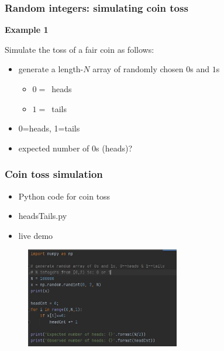 \documentclass[english,14pt]{beamer}
\begin{document}
\begin{frame}[fragile]

\frametitle{Random integers: simulating coin toss}

\textbf{Example 1}\\
\vspace*{5mm}

Simulate the toss of a fair coin as follows:

\begin{itemize}
	\item generate a length-$N$ array of randomly chosen $0$s and $1$s
	\begin{itemize}
		\item $0 = $~heads
		\item $1 = $~tails
	\end{itemize}
	\item 0=heads, 1=tails
	\item expected number of 0s (heads)?
\end{itemize}

\end{frame}


\begin{frame}[fragile]

\frametitle{Coin toss simulation}

\begin{itemize}
	\item Python code for coin toss
	\item headsTails.py
	\item live demo
\end{itemize}

\begin{figure}[ht]
	\centering
	\includegraphics[width=0.6\textwidth]{figures/headsTails}
\end{figure}

\end{frame}
\end{document}
